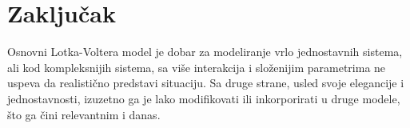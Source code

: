 \documentclass[a4paper]{article}
\begin{document}
\section{Zaključak}
\label{sec:zakljucak}

Osnovni Lotka-Voltera model je dobar za modeliranje vrlo jednostavnih sistema,
ali kod kompleksnijih sistema, sa više interakcija i složenijim parametrima ne uspeva
da realistično predstavi situaciju. Sa druge strane, usled svoje elegancije i jednostavnosti,
izuzetno ga je lako modifikovati ili inkorporirati u druge modele, što ga čini relevantnim i danas.
\end{document}
